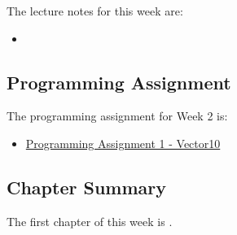 \noindent The lecture notes for this week are:

\begin{itemize}
    \item {}
\end{itemize}

\subsection{Programming Assignment}

The programming assignment for Week 2 is:

\begin{itemize}
    \item \href{https://github.com/QuantumCompiler/CU/tree/main/CSPB%202270%20-%20Data%20Structures/CSPB%202270%20-%20Programming%20Assignments/CSPB%202270%20-%20Assignment%201%20-%20Vector10}{Programming Assignment 1 - Vector10}
\end{itemize}

\subsection{Chapter Summary}

The first chapter of this week is .

